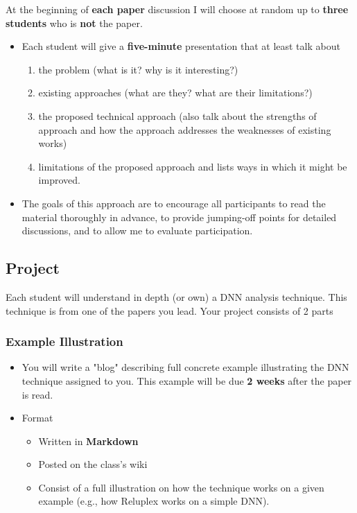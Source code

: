 \documentclass[11pt, a4paper]{article}
\begin{document}
At the beginning of \textbf{\textbf{each paper}} discussion I will choose at random up to
\textbf{\textbf{three students}} who is \textbf{not} the paper.
\begin{itemize}
\item Each student will give a \textbf{five-minute} presentation that at least talk about 
\begin{enumerate}
\item the problem (what is it? why is it interesting?)
\item existing approaches (what are they? what are their limitations?)
\item the proposed technical approach (also talk about the strengths of approach and how the approach addresses the weaknesses of  existing works)
\item limitations of the proposed approach and lists ways in which it might be improved.
\end{enumerate}

\item The goals of this approach are to encourage all participants to read the material thoroughly in advance, to provide jumping-off points for detailed discussions, and to allow me to evaluate participation.
\end{itemize}


\subsection*{Project}
\label{sec:org6da900e}

Each student will understand in depth (or own) a DNN analysis technique.  This technique is from one of the papers you lead.  Your project consists of 2 parts

\subsubsection*{Example Illustration}
\label{sec:orga9923fc}
\begin{itemize}
\item You will write a "blog" describing full concrete example illustrating the DNN technique assigned to you. This example will be due \textbf{\textbf{2 weeks}} after the paper is read.

\item Format
\begin{itemize}
\item Written in \textbf{Markdown}
\item Posted on the class's wiki
\item Consist of a full illustration on how the technique works on a given example (e.g., how Reluplex works on a simple DNN).
\end{itemize}
\end{itemize}
\end{document}
